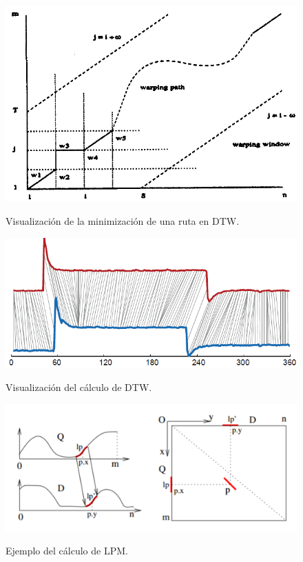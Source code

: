 \begin{figure}[h]
\vspace{0.1in}
\begin{center}
\includegraphics[scale=0.6]{dtw.png}\\
\end{center}
\caption{Visualizaci\'on de la minimizaci\'on de una ruta en DTW.}
\label{arm:fig3}
\end{figure}
\begin{figure}[h]
\vspace{0.1in}
\begin{center}
\includegraphics[scale=0.6]{dtw2.png}\\
\end{center}
\caption{Visualizaci\'on del c\'alculo de DTW.}
\label{arm:fig4}
\end{figure}
\begin{figure}[h]
\vspace{0.1in}
\begin{center}
\includegraphics[scale=0.8]{spade.png}\\
\end{center}
\caption{Ejemplo del c\'alculo de LPM.}
\label{arm:fig5}
\end{figure}

